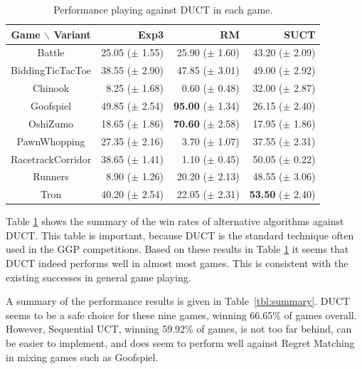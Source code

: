\documentclass[conference]{IEEEtran}
\begin{document}
\begin{table}
\begin{center}
\begin{tabular}{|c|rrr|}
\hline
 Game $\backslash$ Variant    & Exp3		 & RM		 & SUCT		\\ 
\hline
                   Battle     & 25.05 ($\pm$ 1.55)	& 25.90 ($\pm$ 1.60)	      & 43.20 ($\pm$ 2.09)	\\ 
         BiddingTicTacToe     & 38.55 ($\pm$ 2.90)	& 47.85 ($\pm$ 3.01)	      & 49.00 ($\pm$ 2.92)	\\ 
                  Chinook     & 8.25 ($\pm$ 1.68)	  & 0.60 ($\pm$ 0.48)	        & 32.00 ($\pm$ 2.87)	\\ 
                Goofspiel     & 49.85 ($\pm$ 2.54)	& {\bf 95.00} ($\pm$ 1.34)	& 26.15 ($\pm$ 2.40)	\\ 
                 OshiZumo     & 18.65 ($\pm$ 1.86)	& {\bf 70.60} ($\pm$ 2.58)	& 17.95 ($\pm$ 1.86)	\\ 
             PawnWhopping     & 27.35 ($\pm$ 2.16)	& 3.70 ($\pm$ 1.07)	        & 37.55 ($\pm$ 2.31)	\\ 
        RacetrackCorridor     & 38.65 ($\pm$ 1.41)	& 1.10 ($\pm$ 0.45)       	& 50.05 ($\pm$ 0.22)	\\ 
                  Runners     & 8.90 ($\pm$ 1.26)	  & 20.20 ($\pm$ 2.13)	      & 48.55 ($\pm$ 3.06)	\\ 
                     Tron     & 40.20 ($\pm$ 2.54)	& 22.05 ($\pm$ 2.31)	      & {\bf 53.50} ($\pm$ 2.40)	\\ 
\hline
\end{tabular}
\end{center}
\caption{Performance playing against DUCT in each game. \label{tbl:vsduct}}
\end{table}




Table \ref{tbl:vsduct} shows the summary of the win rates of alternative algorithms against DUCT. This table is important, because DUCT is the 
standard technique often used in the GGP competitions. Based on these results in Table \ref{tbl:vsduct} it seems that DUCT indeed performs 
well in almost most games. This is consistent with the existing successes in general game playing. 

A summary of the performance results is given in Table~\ref{tbl:summary}. DUCT seems to be a safe choice for these nine games, 
winning 66.65\% of games overall. 
However, Sequential UCT, winning 59.92\% of games, is not too far behind, can be easier to implement, and does seem to perform well 
against Regret Matching in mixing games such as Goofspiel.  
\end{document}

